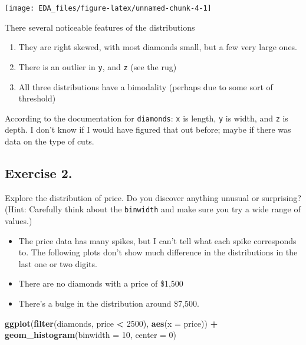 \documentclass[]{book}
\newenvironment{Shaded}{\begin{snugshade}}{\end{snugshade}}
\newcommand{\DataTypeTok}[1]{\textcolor[rgb]{0.13,0.29,0.53}{#1}}
\newcommand{\DecValTok}[1]{\textcolor[rgb]{0.00,0.00,0.81}{#1}}
\newcommand{\KeywordTok}[1]{\textcolor[rgb]{0.13,0.29,0.53}{\textbf{#1}}}
\newcommand{\NormalTok}[1]{#1}
\newcommand{\OperatorTok}[1]{\textcolor[rgb]{0.81,0.36,0.00}{\textbf{#1}}}
\newcommand{\StringTok}[1]{\textcolor[rgb]{0.31,0.60,0.02}{#1}}
\providecommand{\tightlist}{%
  \setlength{\itemsep}{0pt}\setlength{\parskip}{0pt}}
\theoremstyle{definition}
\theoremstyle{definition}
\theoremstyle{definition}
\theoremstyle{remark}
\begin{document}
\begin{center}\texttt{[image: EDA\_files/figure-latex/unnamed-chunk-4-1]} \end{center}

There several noticeable features of the distributions

\begin{enumerate}
\def\labelenumi{\arabic{enumi}.}
\tightlist
\item
  They are right skewed, with most diamonds small, but a few very large
  ones.
\item
  There is an outlier in \texttt{y}, and \texttt{z} (see the rug)
\item
  All three distributions have a bimodality (perhaps due to some sort of
  threshold)
\end{enumerate}

According to the documentation for \texttt{diamonds}: \texttt{x} is
length, \texttt{y} is width, and \texttt{z} is depth. I don't know if I
would have figured that out before; maybe if there was data on the type
of cuts.

\hypertarget{exercise-2.-7}{%
\subsection{Exercise 2.}\label{exercise-2.-7}}

Explore the distribution of price. Do you discover anything unusual or
surprising? (Hint: Carefully think about the \texttt{binwidth} and make
sure you try a wide range of values.)

\begin{itemize}
\tightlist
\item
  The price data has many spikes, but I can't tell what each spike
  corresponds to. The following plots don't show much difference in the
  distributions in the last one or two digits.
\item
  There are no diamonds with a price of \$1,500
\item
  There's a bulge in the distribution around \$7,500.
\end{itemize}

\begin{Shaded}
\begin{Highlighting}[]
\KeywordTok{ggplot}\NormalTok{(}\KeywordTok{filter}\NormalTok{(diamonds, price }\OperatorTok{<}\StringTok{ }\DecValTok{2500}\NormalTok{), }\KeywordTok{aes}\NormalTok{(}\DataTypeTok{x =}\NormalTok{ price)) }\OperatorTok{+}
\StringTok{  }\KeywordTok{geom_histogram}\NormalTok{(}\DataTypeTok{binwidth =} \DecValTok{10}\NormalTok{, }\DataTypeTok{center =} \DecValTok{0}\NormalTok{)}
\end{Highlighting}
\end{Shaded}
\end{document}
